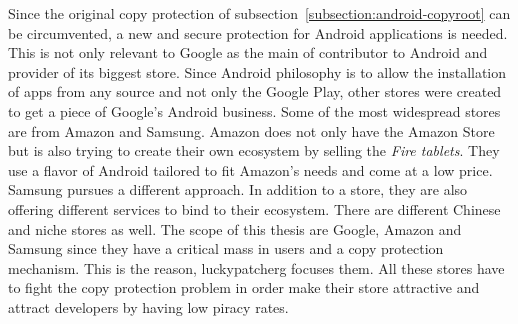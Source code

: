 Since the original copy protection of subsection~\ref{subsection:android-copyroot} can be circumvented, a new and secure protection for Android applications is needed.
This is not only relevant to Google as the main of contributor to Android and provider of its biggest store.
Since Android philosophy is to allow the installation of apps from any source and not only the Google Play, other stores were created to get a piece of Google's Android business.
Some of the most widespread stores are from Amazon and Samsung.
Amazon does not only have the Amazon Store but is also trying to create their own ecosystem by selling the \textit{Fire tablets}.
They use a flavor of Android tailored to fit Amazon's needs and come at a low price.
Samsung pursues a different approach.
In addition to a store, they are also offering different services to bind to their ecosystem.
There are different Chinese and niche stores as well.
\newline
The scope of this thesis are Google, Amazon and Samsung since they have a critical mass in users and a copy protection mechanism.
This is the reason, \gls{luckypatcherg} focuses them.
\newline
All these stores have to fight the copy protection problem in order make their store attractive and attract developers by having low piracy rates.
